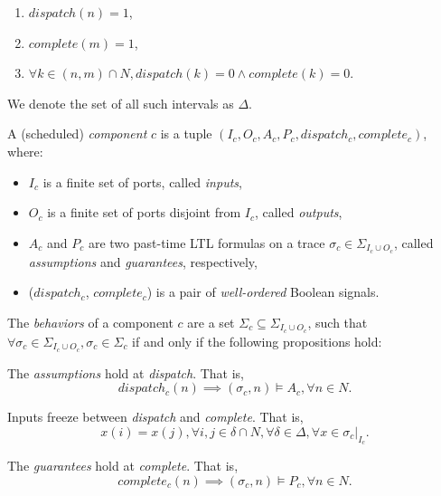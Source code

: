 \begin{enumerate}
	\item $ dispatch(n) = 1 $, 
	\item $ complete(m) = 1 $, 
	\item $ \forall k\in (n, m) \cap N, dispatch(k)=0 \wedge complete(k)=0 $.
\end{enumerate}

We denote the set of all such intervals as $\Delta$.

\bigskip
{}
A (scheduled) \emph{component} $c$ is a tuple $(I_c, O_c, A_c, P_c, dispatch_c, complete_c)$, where: 

\begin{itemize}
    	\item $I_c$ is a finite set of ports, called \emph{inputs},
    	\item $O_c$ is a finite set of ports disjoint from $I_c$, called \emph{outputs},
	\item $A_c$ and $P_c$ are two past-time LTL formulas on a trace $\sigma_c \in \Sigma_{I_c \cup O_c}$, called \emph{assumptions} and \emph{guarantees}, respectively,	
    	\item ($dispatch_c$, $complete_c$) is a pair of \emph{well-ordered} Boolean signals.
\end{itemize}

The \emph{behaviors} of a component $c$ are a set $\Sigma_c \subseteq \Sigma_{I_c \cup O_c}$, such that $\forall \sigma_c \in \Sigma_{I_c \cup O_c}, \sigma_c \in \Sigma_c $ if and only if the following propositions hold:

\bigskip
The \emph{assumptions} hold at \emph{dispatch}. That is,
\begin{equation} 
\label{eqn:assumption}
	dispatch_c(n) \implies (\sigma_c, n) \models A_c, \forall n\in N.
\end{equation}

Inputs freeze between \emph{dispatch} and \emph{complete}. That is,
\begin{equation} 
\label{eqn:inputfreeze}
	x(i) = x(j), \forall i,j\in \delta \cap N, \forall \delta \in \Delta, \forall x \in \sigma_c|_{I_c}.
\end{equation}

The \emph{guarantees} hold at \emph{complete}. That is,
\begin{equation} 
\label{eqn:guarantee}
	complete_c(n) \implies (\sigma_c, n) \models P_c, \forall n\in N.
\end{equation}

